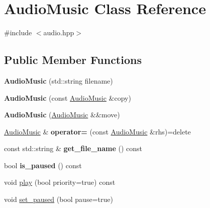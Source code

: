 \hypertarget{class_audio_music}{}\section{Audio\+Music Class Reference}
\label{class_audio_music}


{\ttfamily \#include $<$audio.\+hpp$>$}

\subsection*{Public Member Functions}
\begin{DoxyCompactItemize}
\item 
\mbox{\label{class_audio_music_a260b6ddf241e3f1e865a49309aa12572}} 
{\bfseries Audio\+Music} (std\+::string filename)
\item 
\mbox{\label{class_audio_music_a742e8a6822342b8de08175e3948e5830}} 
{\bfseries Audio\+Music} (const \mbox{\hyperlink{class_audio_music}{Audio\+Music}} \&copy)
\item 
\mbox{\label{class_audio_music_a55779c2cc75a89cf808d92e313d80ae8}} 
{\bfseries Audio\+Music} (\mbox{\hyperlink{class_audio_music}{Audio\+Music}} \&\&move)
\item 
\mbox{\label{class_audio_music_a9487a5b790ede77cc96efd6e70322253}} 
\mbox{\hyperlink{class_audio_music}{Audio\+Music}} \& {\bfseries operator=} (const \mbox{\hyperlink{class_audio_music}{Audio\+Music}} \&rhs)=delete
\item 
\mbox{\label{class_audio_music_a794b5133068bacd9d5954316c466e781}} 
const std\+::string \& {\bfseries get\+\_\+file\+\_\+name} () const
\item 
\mbox{\label{class_audio_music_a103d6a71de74441ad5b63fec5f50d656}} 
bool {\bfseries is\+\_\+paused} () const
\item 
void \mbox{\hyperlink{class_audio_music_a9867971e26b4d081936287af1923fd1a}{play}} (bool priority=true) const
\item 
void \mbox{\hyperlink{class_audio_music_a5de1c2fc9f565af444c48b85b56d7c8f}{set\+\_\+paused}} (bool pause=true)
\end{DoxyCompactItemize}


